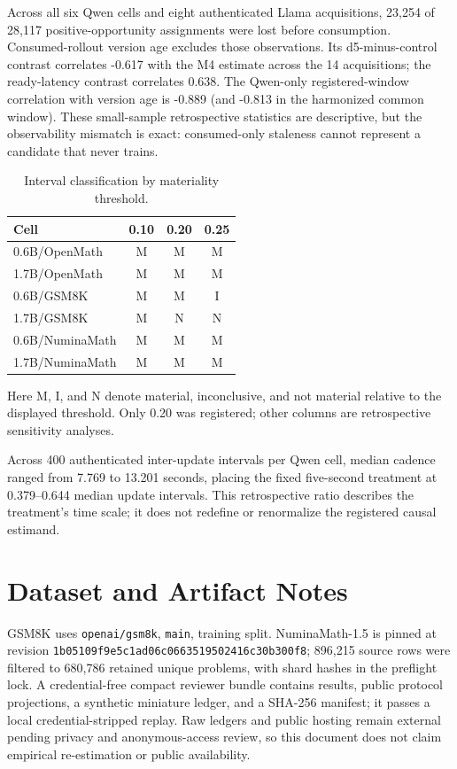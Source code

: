 \documentclass{article}
\begin{document}
Across all six Qwen cells and eight authenticated Llama acquisitions, 23,254 of 28,117 positive-opportunity assignments were lost before consumption. Consumed-rollout version age excludes those observations. Its d5-minus-control contrast correlates -0.617 with the M4 estimate across the 14 acquisitions; the ready-latency contrast correlates 0.638. The Qwen-only registered-window correlation with version age is -0.889 (and -0.813 in the harmonized common window). These small-sample retrospective statistics are descriptive, but the observability mismatch is exact: consumed-only staleness cannot represent a candidate that never trains.

\begin{table}[h]
\caption{Interval classification by materiality threshold.}
\centering\small
\begin{tabular}{lccc}
\toprule
Cell & 0.10 & 0.20 & 0.25 \\
\midrule
0.6B/OpenMath & M & M & M \\
1.7B/OpenMath & M & M & M \\
0.6B/GSM8K & M & M & I \\
1.7B/GSM8K & M & N & N \\
0.6B/NuminaMath & M & M & M \\
1.7B/NuminaMath & M & M & M \\
\bottomrule
\end{tabular}
\end{table}
Here M, I, and N denote material, inconclusive, and not material relative to the displayed threshold. Only 0.20 was registered; other columns are retrospective sensitivity analyses.

Across 400 authenticated inter-update intervals per Qwen cell, median cadence
ranged from 7.769 to 13.201 seconds, placing the fixed five-second treatment at
0.379--0.644 median update intervals. This retrospective ratio describes the
treatment's time scale; it does not redefine or renormalize the registered
causal estimand.

\section{Dataset and Artifact Notes}
GSM8K uses \texttt{openai/gsm8k}, \texttt{main}, training split. NuminaMath-1.5 is pinned at revision \texttt{1b05109f9e5c1ad06c0663519502416c30b300f8}; 896,215 source rows were filtered to 680,786 retained unique problems, with shard hashes in the preflight lock. A credential-free compact reviewer bundle contains results, public protocol projections, a synthetic miniature ledger, and a SHA-256 manifest; it passes a local credential-stripped replay. Raw ledgers and public hosting remain external pending privacy and anonymous-access review, so this document does not claim empirical re-estimation or public availability.
\end{document}
